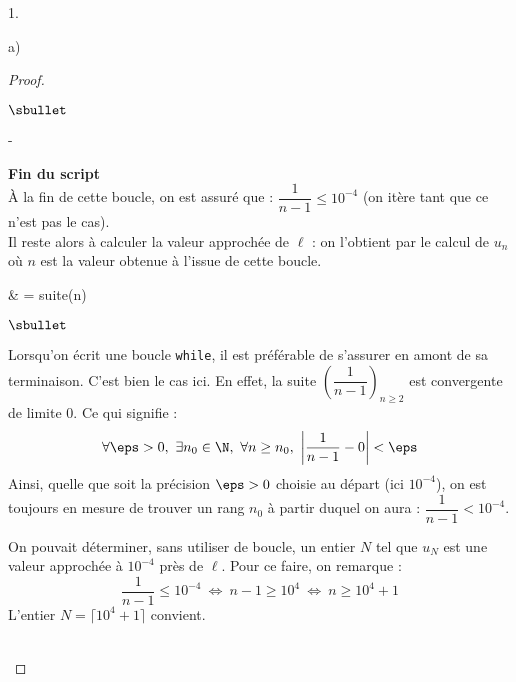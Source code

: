 \documentclass[11pt]{article}%
\begin{document}
\begin{noliste}{1.}
\begin{noliste}{a)}
\begin{proof}
\begin{noliste}{$\sbullet$}
\begin{noliste}{-}
        \item {\bf Fin du script}\\
          À la fin de cette boucle, on est assuré que :
          $\dfrac{1}{n-1} \leq 10^{-4}$ (on itère tant que ce n'est
          pas le cas).\\
          Il reste alors à calculer la valeur approchée de $\ell$ : on
          l'obtient par le calcul de $u_n$ où $n$ est la valeur
          obtenue à l'issue de cette boucle.
          \begin{scilabC}{5}
            & \quad {} = suite(n)
          \end{scilabC}
        \end{noliste}
      \end{noliste}
      \begin{remark}
        \begin{noliste}{$\sbullet$}
        \item Lorsqu'on écrit une boucle {\tt while}, il est
          préférable de s'assurer en amont de sa terminaison. C'est
          bien le cas ici. En effet, la suite
          $\left(\dfrac{1}{n-1}\right)_{n \geq 2}$ est convergente de
          limite $0$. Ce qui signifie :
          \[
            \forall \eps > 0, \ \exists n_0 \in \N, \ \forall n \geq
            n_0, \ \left\vert \dfrac{1}{n-1} - 0 \right\vert < \eps
          \]
          Ainsi, quelle que soit la précision $\eps >0$ choisie au
          départ (ici $10^{-4}$), on est toujours en mesure de trouver
          un rang $n_0$ à partir duquel on aura : $\dfrac{1}{n-1} < 10^{-4}$.
          
        \item On pouvait déterminer, sans utiliser de boucle, un
          entier $N$ tel que $u_N$ est une valeur approchée
          à $10^{-4}$ près de $\ell$. Pour ce faire, on remarque :
          \[
            \dfrac{1}{n-1} \leq 10^{-4} \ \Leftrightarrow \ n-1 \geq
            10^4 \ \Leftrightarrow \ n \geq 10^4 +1
          \]
          L'entier $N = \lceil 10^4 +1 \rceil$ convient.
        \end{noliste}
      \end{remark}~\\[-1.4cm]
    \end{proof}
  \end{noliste}
\end{noliste}
\end{document}
